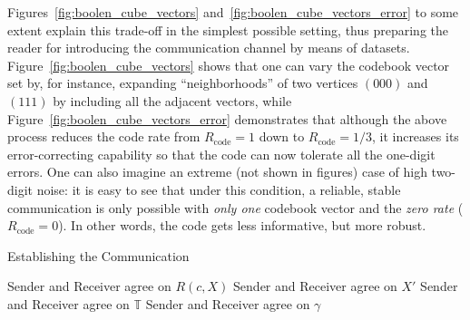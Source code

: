 Figures~\ref{fig:boolen_cube_vectors} and~\ref{fig:boolen_cube_vectors_error} to
some extent explain this trade-off in the simplest possible setting, thus
preparing the reader for introducing the communication channel by means of
datasets. Figure~\ref{fig:boolen_cube_vectors} shows that one can vary the
codebook vector set by, for instance, expanding ``neighborhoods'' of two
vertices $(000)$ and $(111)$ by including all the adjacent vectors, while
Figure~\ref{fig:boolen_cube_vectors_error} demonstrates that although the above
process reduces the code rate from $R_{\text{code}} = 1$ down to
$R_{\text{code}} = 1/3$, it increases its error-correcting capability so that
the code can now tolerate all the one-digit errors. One can also imagine an
extreme (not shown in figures) case of high two-digit noise: it is easy to see
that under this condition, a reliable, stable communication is only possible
with \textit{only one} codebook vector and the \textit{zero rate}
($R_{\text{code}} = 0$). In other words, the code gets less informative, but
more robust. 

\begin{algorithm}[th!]
\caption{Establishing the Communication}\label{alg:communication_establishing}

{Sender and Receiver agree on $R(c, X)$\;}
{Sender and Receiver agree on $X'$\;}
{Sender and Receiver agree on $\mathbb{T}$\;}
{Sender and Receiver agree on $\gamma$\;}
\end{algorithm}

